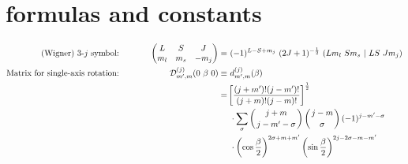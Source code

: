 \documentclass[onecolumn,preprint,superscriptaddress,nofootinbib,notitlepage,10pt,linenumbers]{revtex4-1}
\newcommand{\threej}[6]{\ensuremath{\begin{pmatrix}#1 & #2 & #3\\#4&#5&#6 \end{pmatrix}}}
\begin{document}
\newpage

\section{formulas and constants}

\begin{alignat}{2}
\text{(Wigner) 3-$j$ symbol:} &\hspace{1cm}& \threej{L}{S}{J}{m_l}{m_s}{-m_j}=&~(-1)^{L-S+m_j}~(2J+1)^{-\frac{1}{2}}~(Lm_l~Sm_s~\vert~LS~Jm_j)\\
\text{Matrix for single-axis rotation:} &\hspace{1cm}&   \mathcal{D}_{m^\prime,m}^{(j)}(0~\beta~0)\equiv&~d_{m^\prime,m}^{(j)}(\beta)\nonumber\\
&\hspace{1cm}& =&\left[\frac{(j+m^\prime)!(j-m^\prime)!}{(j+m)!(j-m)!}\right]^\frac{1}{2}\nonumber\\
&\hspace{1cm}&&~\cdot\sum_\sigma\left(j+m\atop j-m^\prime-\sigma\right)\left(j-m\atop \sigma\right)(-1)^{j-m^\prime-\sigma}\nonumber\\
&\hspace{1cm}&&~\cdot\left(\cos\frac{\beta}{2}\right)^{2\sigma+m+m^\prime}\left(\sin\frac{\beta}{2}\right)^{2j-2\sigma-m-m^\prime}
\end{alignat}


\end{document}
